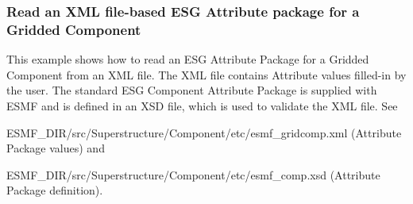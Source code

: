  
\setlength{\oldparskip}{\parskip}
\setlength{\parskip}{1.5ex}
\setlength{\oldparindent}{\parindent}
\setlength{\parindent}{0pt}
\setlength{\oldbaselineskip}{\baselineskip}
\setlength{\baselineskip}{11pt}
 
\def\bv{\begin{verbatim}}
\def\ev{\end{verbatim}}
\def\be{\begin{equation}}
\def\ee{\end{equation}}
\def\bea{\begin{eqnarray}}
\def\eea{\end{eqnarray}}
\def\bi{\begin{itemize}}
\def\ei{\end{itemize}}
\def\bn{\begin{enumerate}}
\def\en{\end{enumerate}}
\def\bd{\begin{description}}
\def\ed{\end{description}}
\def\({\left (}
\def\){\right )}
\def\[{\left [}
\def\]{\right ]}
\def\<{\left  \langle}
\def\>{\right \rangle}
\def\cI{{\cal I}}
\def\diag{\mathop{\rm diag}}
\def\tr{\mathop{\rm tr}}


 

   \subsubsection{Read an XML file-based ESG Attribute package for a Gridded Component}
   This example shows how to read an ESG Attribute Package for a Gridded
   Component from an XML file.  The XML file contains Attribute values filled-in
   by the user.  The standard ESG Component Attribute Package is supplied with
   ESMF and is defined in an XSD file, which is used to validate the XML file.
   See
   \begin{description}
   \item ESMF\_DIR/src/Superstructure/Component/etc/esmf\_gridcomp.xml (Attribute Package values) and
   \item ESMF\_DIR/src/Superstructure/Component/etc/esmf\_comp.xsd (Attribute Package definition).
   \end{description} 

